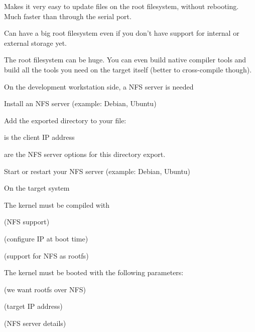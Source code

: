   \startitemize
  \item Makes it very easy to update files on the root filesystem,
    without rebooting. Much faster than through the serial port.
  \item Can have a big root filesystem even if you don't have support
    for internal or external storage yet.
  \item The root filesystem can be huge. You can even build native
    compiler tools and build all the tools you need on the target
    itself (better to cross-compile though).
  \stopitemize



  On the development workstation side, a NFS server is needed

  \startitemize
  \item Install an NFS server (example: Debian, Ubuntu)\\
  \item Add the exported directory to your  file:\\
    \startitemize
    \item {} is the client IP address
    \item {} are the NFS server
      options for this directory export.
    \stopitemize
  \item Start or restart your NFS server (example: Debian, Ubuntu)\\
  \stopitemize

  \startitemize
  \item On the target system
  \item The kernel must be compiled with
    \startitemize
    \item {} (NFS support)
    \item {} (configure IP at boot time)
    \item {} (support for NFS as rootfs)
    \stopitemize
  \item The kernel must be booted with the following parameters:
    \startitemize
    \item {} (we want rootfs over NFS)
    \item {} (target IP address)
    \item {} (NFS server details)
    \stopitemize
  \stopitemize


